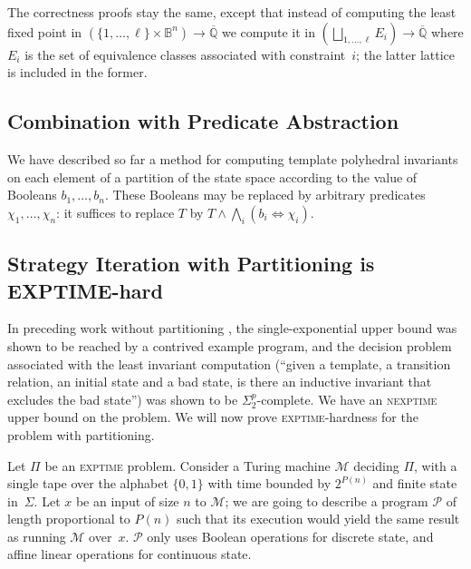 \documentclass{llncs}
\newcommand{\rronly}[1]{#1}
\newcommand{\BB}{\mathbb{B}}
\newcommand{\QQ}{\mathbb{Q}}
\newcommand{\calM}{\mathcal{M}}
\newcommand{\calP}{\mathcal{P}}
\begin{document}
\rronly{ 
The correctness proofs stay the same, except that instead of
  computing the least fixed point in $\left(\{ 1, \dots, \ell \}
    \times \BB^n \right)\rightarrow \overline{\QQ}$ we compute it in
  $\left( \bigsqcup_{1, \dots, \ell} E_i \right) \rightarrow
  \overline{\QQ}$ where $E_i$ is the set of equivalence classes
  associated with constraint~$i$; the latter lattice is included in
  the former.  
}

\rronly{
\subsection{Combination with Predicate Abstraction}
We have described so far a method for computing template polyhedral invariants on each element of a partition of the state space according to the value of Booleans $b_1,\dots,b_n$. These Booleans may be replaced by arbitrary predicates $\chi_1,\dots,\chi_n$: it suffices to replace $T$ by $T \land \bigwedge_i (b_i \Leftrightarrow \chi_i)$.

\subsection{Strategy Iteration with Partitioning is EXPTIME-hard}

In preceding work without partitioning
\cite{GM11,Gawlitza_Monniaux_LMCS12}, the single-exponential upper
bound was shown to be reached by a contrived example program, and the
decision problem associated with the least invariant computation
(``given a template, a transition relation, an initial state and a bad
state, is there an inductive invariant that excludes the bad state'')
was shown to be $\Sigma^p_2$-complete.  We have an \textsc{nexptime}
upper bound on the problem.  We will now prove
\textsc{exptime}-hardness for the problem with partitioning.

Let $\Pi$ be an \textsc{exptime} problem.  Consider a Turing machine $\calM$
deciding $\Pi$, with a single tape over the alphabet $\{0,1\}$ with
time bounded by $2^{P(n)}$ and finite state in~$\Sigma$.  Let $x$ be
an input of size $n$ to $\calM$; we are going to describe a program
$\calP$ of length proportional to $P(n)$ such that its execution would
yield the same result as running $\calM$ over~$x$. $\calP$ only uses
Boolean operations for discrete state, and affine linear operations
for continuous state.

}
\end{document}
